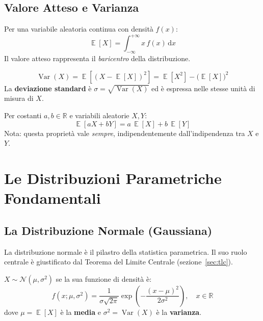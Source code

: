 \documentclass[12pt, a4paper]{article}
\DeclareMathOperator{\Var}{Var}
\DeclareMathOperator{\E}{\mathbb{E}}
\newcommand{\N}{\mathcal{N}}
\newcommand{\R}{\mathbb{R}}
\begin{document}
\subsection{Valore Atteso e Varianza}

\begin{definizione}
  Per una variabile aleatoria continua con densità $f(x)$:
  \[
    \E[X] = \int_{-\infty}^{+\infty} x\, f(x)\, \mathrm{d}x
  \]
  Il valore atteso rappresenta il \emph{baricentro} della distribuzione.
\end{definizione}

\begin{definizione}[Varianza]
  \[
    \Var(X) = \E\!\left[(X - \E[X])^2\right]
             = \E[X^2] - \bigl(\E[X]\bigr)^2
  \]
  La \textbf{deviazione standard} è $\sigma = \sqrt{\Var(X)}$ ed è espressa
  nelle stesse unità di misura di $X$.
\end{definizione}

\begin{proprieta}
  Per costanti $a, b \in \R$ e variabili aleatorie $X, Y$:
  \[
    \E[aX + bY] = a\,\E[X] + b\,\E[Y]
  \]
  Nota: questa proprietà vale \emph{sempre}, indipendentemente
  dall'indipendenza tra $X$ e $Y$.
\end{proprieta}

\section{Le Distribuzioni Parametriche Fondamentali}

\subsection{La Distribuzione Normale (Gaussiana)}

La distribuzione normale è il pilastro della statistica parametrica.
Il suo ruolo centrale è giustificato dal Teorema del Limite Centrale
(sezione~\ref{sec:tlc}).

\begin{definizione}
  $X \sim \N(\mu, \sigma^2)$ se la sua funzione di densità è:
  \[
    \boxed{f(x; \mu, \sigma^2) =
      \frac{1}{\sigma\sqrt{2\pi}}
      \exp\!\left(-\frac{(x-\mu)^2}{2\sigma^2}\right),
      \quad x \in \R}
  \]
  dove $\mu = \E[X]$ è la \textbf{media} e $\sigma^2 = \Var(X)$ è la
  \textbf{varianza}.
\end{definizione}
\end{document}
